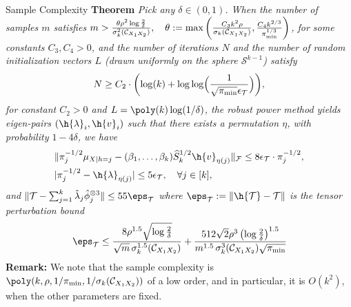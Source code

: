 \documentclass[final,t]{beamer}
\begin{document}
\begin{frame}{}
\begin{columns}[t]
    \begin{column}{0.3\linewidth}
      \begin{block}{Sample Complexity}
      \textbf{Theorem}
        \emph{Pick  any $\delta\in (0,1)$. When the number of samples $m$ satisfies
        $ m >\frac{\theta\rho^2  \log\frac{2}{\delta}}{\sigma^2_k(\Ccal_{X_1 X_2})},
        \quad \theta:= \max\left(\frac{C_3 k^2 \rho}{\sigma_k( \Ccal_{X_1 X_2})}, \frac{C_4k^{2/3}\iffalse(1+\sigma_{k+1}(\Ccal_{X_1 X_2}))^2 \fi }{\pi_{\min}^{1/3}}\right)$, for some constants $C_3, C_4>0$, and the number of iterations $N$  and  the number of random initialization vectors $L$  (drawn uniformly on the sphere $\mathcal{S}^{k-1}$)  satisfy
        $$
          N \geq C_2 \cdot \biggl( \log(k) + \log\log\Bigl(
         \frac{1}{\sqrt{\pi_{\min}}\epsilon_{{\mathcal{T}}}} \Bigr) \biggr),
        $$
        for constant $C_2>0$ and  $L = \poly(k) \log(1/\delta)$,  the robust power method yields eigen-pairs $(\h{\lambda}_i, \h{v}_i)$ such that there exists a permutation $\eta$, with probability $1-4\delta$, we have
        \begin{align*}
        &\|\pi^{-1/2}_{j} \mu_{X|h=j}-(\beta_1,\ldots,\beta_k) \widehat  S_k^{1/2}\h{v}_{\eta(j)}\|_{\Fcal} \leq 8 \epsilon_{\Tcal} \cdot\pi^{-1/2}_{j}
        , \\
        &|\pi^{-1/2}_{j}-\h{\lambda}_{\eta(j)}| \leq  5\epsilon_{\Tcal}, \quad \forall j \in [k],
        \end{align*}
        and $\|\Tcal - \sum\nolimits_{j=1}^k \hat\lambda_j \hat{\phi}_j^{\otimes 3} \| \leq 55\eps_{\Tcal}$ where $\eps_{\Tcal}:= \|\h{\Tcal} - \Tcal\|$ is the tensor perturbation bound
        \vspace{-10mm}
        \begin{align*} \eps_{\Tcal} \leq
        \frac{8 \rho^{1.5} \sqrt{\log\frac{2}{\delta}}}{\sqrt{m} \, \sigma_k^{1.5}(\Ccal_{X_1 X_2})} + \frac{512 \sqrt{2} \rho^3 \left(\log\frac{2}{\delta}\right)^{1.5}}{m^{1.5} \,\sigma_k^{3}(\Ccal_{X_1 X_2}) \sqrt{\pi_{\min}}}
        \end{align*}
        }
        {\bf Remark:} We note that the sample complexity is  $\poly(k, \rho, 1/\pi_{\min}, 1/\sigma_k(\Ccal_{X_1 X_2}))$ of a low order, and in particular,  it is $O(k^2)$, when the other parameters are fixed. 
      \end{block}



\end{column}
\end{columns}
\end{frame}
\end{document}
